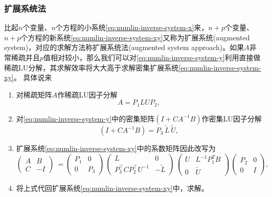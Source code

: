 \subsubsection{扩展系统法}
\label{sec:numlin-inverse-augmented-system}
比起$n$个变量、$n$个方程的小系统\eqref{eq:numlin-inverse-system-x}来，$n+p$个变量、$n+p$个方程的新系统\eqref{eq:numlin-inverse-system-xy}又称为扩展系统(augmented system)，对应的求解方法称扩展系统法(augmented system approach)。如果$A$非常稀疏并且$p$值相对较小，那么我们可以对\eqref{eq:numlin-inverse-system-y}利用直接做稀疏LU分解，其求解效率将大大高于求解密集扩展系统\eqref{eq:numlin-inverse-system-xy}。
具体说来
\begin{enumerate}
\item 对稀疏矩阵$A$作稀疏LU因子分解
\begin{equation}
  \label{eq:numlin-augmented-sparse-lu-factorization}
  A=P_{1} L U P_{2},
\end{equation}
\item 对\eqref{eq:numlin-inverse-system-y}中的密集矩阵$\left( I + C A^{-1} B \right)$作密集LU因子分解
\begin{equation*}
  \left( I + C A^{-1} B \right)
  = P_{3} \, \widetilde{L} \, \widetilde{U},
\end{equation*}
\item 扩展系统\eqref{eq:numlin-inverse-system-xy}中的系数矩阵因此改写为
\begin{equation}
  \label{eq:numlin-inverse-system-augmented-approach}
  \begin{pmatrix}
    A & B \\
    C & -I
  \end{pmatrix}\
  =
  \begin{pmatrix}
    P_{1} & 0 \\
    0 & P_{3}
  \end{pmatrix}
  \,
  \begin{pmatrix}
    L & 0 \\
    P_{3}^{\top} C P_{2}^{\top} U^{-1} & - \widetilde{L}
  \end{pmatrix}
  \,
  \begin{pmatrix}
    U & L^{-1} P_{1}^{T} B \\
    0 & \widetilde{U}
  \end{pmatrix}
  \,
  \begin{pmatrix}
    P_{2} & 0 \\
    0 & I
  \end{pmatrix},
\end{equation}
  \item 将上式代回扩展系统\eqref{eq:numlin-inverse-system-xy}中，求解。
\end{enumerate}

